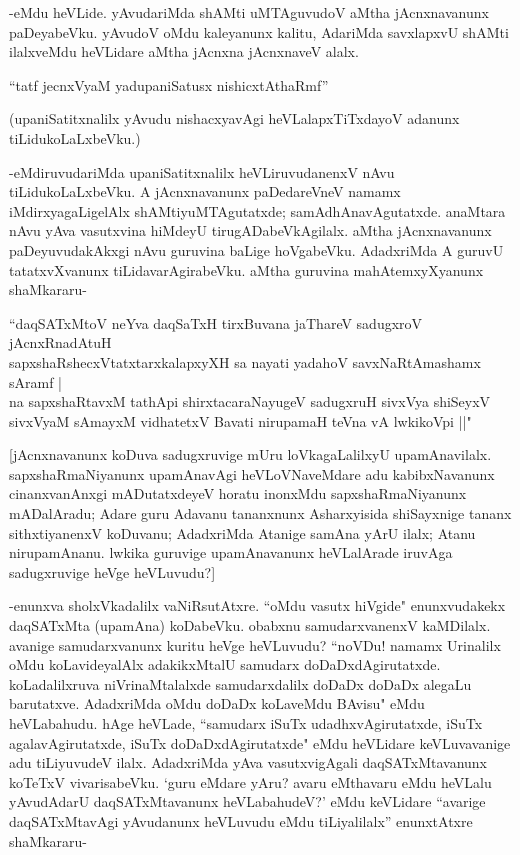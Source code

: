 -eMdu heVLide. yAvudariMda shAMti uMTAguvudoV aMtha jAcnxnavanunx paDeyabeVku. yAvudoV oMdu kaleyanunx kalitu, AdariMda savxlapxvU shAMti ilalxveMdu heVLidare aMtha jAcnxna jAcnxnaveV alalx. 

\begin{shloka}
``tatf jecnxVyaM yadupaniSatusx nishicxtAthaRmf''
\end{shloka}

(upaniSatitxnalilx yAvudu nishacxyavAgi heVLalapxTiTxdayoV adanunx tiLidukoLaLxbeVku.)

-eMdiruvudariMda upaniSatitxnalilx heVLiruvudanenxV nAvu tiLidukoLaLxbeVku. A jAcnxnavanunx paDedareVneV namamx iMdirxyagaLigelAlx shAMtiyuMTAgutatxde; samAdhAnavAgutatxde. anaMtara nAvu yAva vasutxvina hiMdeyU tirugADabeVkAgilalx. aMtha jAcnxnavanunx paDeyuvudakAkxgi nAvu guruvina baLige hoVgabeVku. AdadxriMda A guruvU tatatxvXvanunx tiLidavarAgirabeVku. aMtha guruvina mahAtemxyXyanunx shaMkararu-

\begin{shloka}
``daqSATxMtoV neYva daqSaTxH tirxBuvana jaThareV sadugxroV jAcnxRnadAtuH\\
sapxshaRshecxVtatxtarxkalapxyXH sa nayati yadahoV savxNaRtAmashamx sAramf |\\
na sapxshaRtavxM tathApi shirxtacaraNayugeV sadugxruH sivxVya shiSeyxV\\
sivxVyaM sAmayxM vidhatetxV Bavati nirupamaH teVna vA lwkikoV\s pi ||" 
\end{shloka}

[jAcnxnavanunx koDuva sadugxruvige mUru loVkagaLalilxyU upamAnavilalx. sapxshaRmaNiyanunx upamAnavAgi heVLoVNaveMdare adu kabibxNavanunx cinanxvanAnxgi mADutatxdeyeV horatu inonxMdu sapxshaRmaNiyanunx mADalAradu; Adare guru Adavanu tananxnunx Asharxyisida shiSayxnige tananx sithxtiyanenxV koDuvanu; AdadxriMda Atanige samAna yArU ilalx; Atanu nirupamAnanu. lwkika guruvige upamAnavanunx heVLalArade iruvAga sadugxruvige heVge heVLuvudu?]

-enunxva sholxVkadalilx vaNiRsutAtxre. ``oMdu vasutx hiVgide" enunxvudakekx daqSATxMta (upamAna) koDabeVku. obabxnu samudarxvanenxV kaMDilalx. avanige samudarxvanunx kuritu heVge heVLuvudu? ``noVDu! namamx Urinalilx oMdu koLavideyalAlx adakikxMtalU samudarx doDaDxdAgirutatxde. koLadalilxruva niVrinaMtalalxde samudarxdalilx doDaDx doDaDx alegaLu barutatxve. AdadxriMda oMdu doDaDx koLaveMdu BAvisu" eMdu heVLabahudu. hAge heVLade, ``samudarx iSuTx udadhxvAgirutatxde, iSuTx agalavAgirutatxde, iSuTx doDaDxdAgirutatxde" eMdu heVLidare keVLuvavanige adu tiLiyuvudeV ilalx. AdadxriMda yAva vasutxvigAgali daqSATxMtavanunx koTeTxV vivarisabeVku. `guru eMdare yAru? avaru eMthavaru eMdu heVLalu yAvudAdarU daqSATxMtavanunx heVLabahudeV?' eMdu keVLidare ``avarige daqSATxMtavAgi yAvudanunx heVLuvudu eMdu tiLiyalilalx'' enunxtAtxre shaMkararu-

